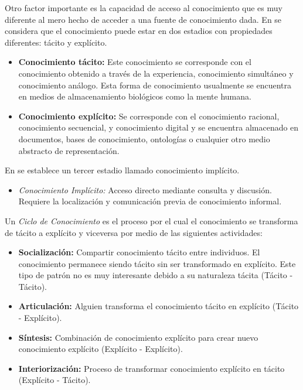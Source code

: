 Otro factor importante es la capacidad de acceso al conocimiento que es muy diferente al mero hecho de acceder a una fuente de conocimiento dada. En \cite{nokata1995} se considera que el conocimiento puede estar en dos estadios con propiedades diferentes: tácito y explícito. 

\begin{itemize}
\item \textbf{Conocimiento tácito:} Este conocimiento se corresponde con el conocimiento obtenido a través de la experiencia, conocimiento simultáneo  y conocimiento análogo. Esta forma de conocimiento usualmente se encuentra en medios de almacenamiento biológicos como la mente humana.

\item \textbf{Conocimiento explícito:} Se corresponde con el conocimiento racional, conocimiento secuencial, y conocimiento digital y se encuentra almacenado en documentos, bases de conocimiento, ontologías o cualquier otro medio abstracto de representación.
\end{itemize}

En \cite{liebowitz1998} se establece un tercer estadio llamado conocimiento implícito.

\begin{itemize}
\item \textit{Conocimiento Implícito:} Acceso directo mediante consulta y discusión. Requiere la localización y comunicación previa de conocimiento informal.
\end{itemize}

Un \textit{Ciclo de Conocimiento} es el proceso por el cual el conocimiento se transforma de tácito a explícito y viceversa por medio de las siguientes actividades:

\begin{itemize}
\item \textbf{Socialización:} Compartir conocimiento tácito entre individuos. El conocimiento permanece siendo tácito sin ser transformado en explícito. Este tipo de patrón no es muy interesante debido a su naturaleza tácita (Tácito - Tácito).

\item \textbf{Articulación:} Alguien transforma el conocimiento tácito en explícito (Tácito - Explícito).

\item \textbf{Síntesis:} Combinación de conocimiento explícito para crear nuevo conocimiento explícito  (Explícito - Explícito).
 
\item \textbf{Interiorización:} Proceso de transformar conocimiento explícito en tácito (Explícito - Tácito).
\end{itemize}

